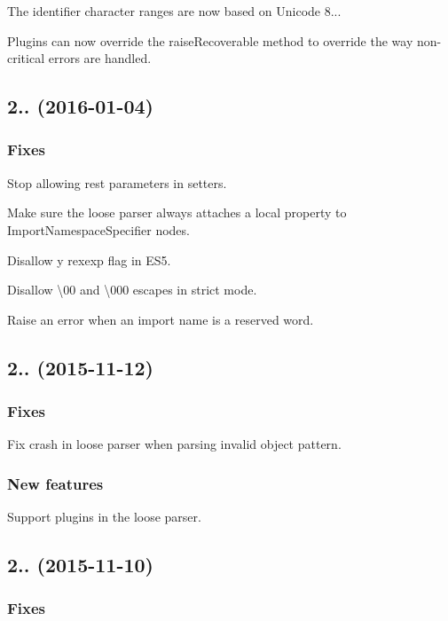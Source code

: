 The identifier character ranges are now based on Unicode 8...

Plugins can now override the {\ttfamily raise\+Recoverable} method to override the way non-\/critical errors are handled.

\subsection*{2.. (2016-\/01-\/04)}

\subsubsection*{Fixes}

Stop allowing rest parameters in setters.

Make sure the loose parser always attaches a {\ttfamily local} property to {\ttfamily Import\+Namespace\+Specifier} nodes.

Disallow {\ttfamily y} rexexp flag in E\+S5.

Disallow {\ttfamily \textbackslash{}00} and {\ttfamily \textbackslash{}000} escapes in strict mode.

Raise an error when an import name is a reserved word.

\subsection*{2.. (2015-\/11-\/12)}

\subsubsection*{Fixes}

Fix crash in loose parser when parsing invalid object pattern.

\subsubsection*{New features}

Support plugins in the loose parser.

\subsection*{2.. (2015-\/11-\/10)}

\subsubsection*{Fixes}

